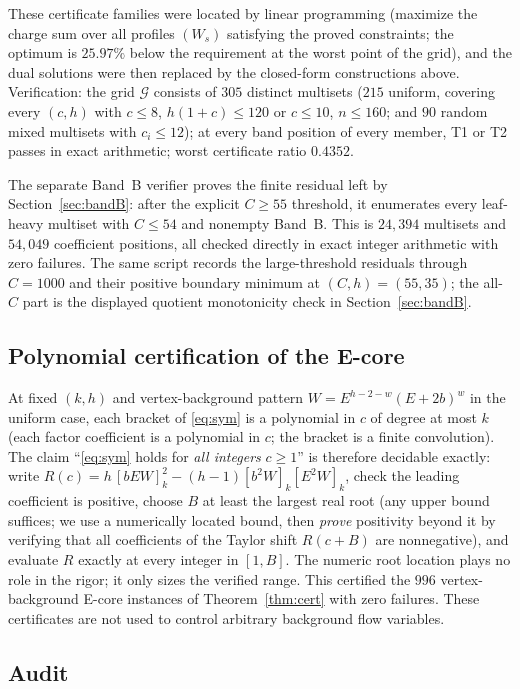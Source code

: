 \documentclass[11pt]{article}
\theoremstyle{definition}
\begin{document}
These certificate families were located by linear programming
(maximize the charge sum over all profiles $(W_s)$ satisfying the
proved constraints; the optimum is $25.97\%$ below the requirement at
the worst point of the grid), and the dual solutions were then
replaced by the closed-form constructions above.  Verification: the
grid $\mathcal G$ consists of $305$ distinct multisets ($215$ uniform,
covering every $(c,h)$ with $c\le8$, $h(1+c)\le120$ or $c\le10$,
$n\le160$; and $90$ random mixed multisets with $c_i\le12$); at every
band position of every member, T1 or T2 passes in exact arithmetic;
worst certificate ratio $0.4352$.

The separate Band~B verifier proves the finite residual left by
Section~\ref{sec:bandB}: after the explicit $C\ge55$ threshold, it
enumerates every leaf-heavy multiset with $C\le54$ and nonempty
Band~B.  This is $24{,}394$ multisets and $54{,}049$ coefficient
positions, all checked directly in exact integer arithmetic with zero
failures.  The same script records the large-threshold residuals through
$C=1000$ and their positive boundary minimum at $(C,h)=(55,35)$; the
all-$C$ part is the displayed quotient monotonicity check in
Section~\ref{sec:bandB}.

\subsection{Polynomial certification of the E-core}\label{sec:polyc}

At fixed $(k,h)$ and vertex-background pattern
$W=E^{h-2-w}(E+2b)^w$ in the uniform case, each bracket of
\eqref{eq:sym} is a polynomial in $c$ of degree at most $k$ (each
factor coefficient is a polynomial in $c$; the bracket is a finite
convolution).  The claim ``\eqref{eq:sym} holds for \emph{all
integers} $c\ge1$'' is therefore decidable exactly: write
$R(c)=h\,[bEW]_k^2-(h-1)[b^2W]_k[E^2W]_k$, check the leading
coefficient is positive, choose $B$ at least the largest real root
(any upper bound suffices; we use a numerically located bound, then
\emph{prove} positivity beyond it by verifying that all coefficients
of the Taylor shift $R(c+B)$ are nonnegative), and evaluate $R$
exactly at every integer in $[1,B]$.  The numeric root location plays
no role in the rigor; it only sizes the verified range.  This
certified the $996$ vertex-background E-core instances of
Theorem~\ref{thm:cert} with zero failures.  These certificates are
not used to control arbitrary background flow variables.

\subsection{Audit}\label{sec:audit}
\end{document}

